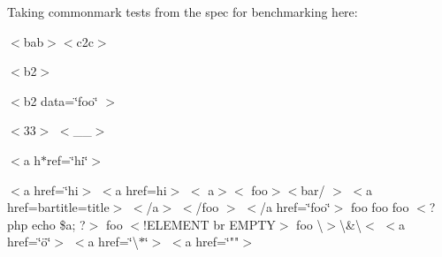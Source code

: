 Taking commonmark tests from the spec for benchmarking here\+:

$<$bab$>$$<$c2c$>$

$<$b2$>$

$<$b2 data=\char`\"{}foo\char`\"{} $>$

\texorpdfstring{$<$}{<}33\texorpdfstring{$>$}{>} $<$\+\_\+\+\_\+$>$

\texorpdfstring{$<$}{<}a h$\ast$ref=\char`\"{}hi\char`\"{}\texorpdfstring{$>$}{>}

\texorpdfstring{$<$}{<}a href=\char`\"{}hi\textquotesingle{}$>$ $<$a href=hi\textquotesingle{}$>$  $<$ a$>$$<$ foo$>$$<$bar/ $>$  $<$a href=\textquotesingle{}bar\textquotesingle{}title=title$>$  $<$/a$>$ $<$/foo $>$  $<$/a href=\char`\"{}foo\char`\"{}$>$  foo    foo   foo $<$?php echo \$a; ?$>$  foo $<$!\+ELEMENT br EMPTY$>$  foo \textbackslash{}$>$\textbackslash{}\&\textbackslash{}$<$  $<$a href=\char`\"{}\"{o}\char`\"{}$>$  $<$a href=\char`\"{}\textbackslash{}$\ast$\char`\"{}$>$  $<$a href=\char`\"{}"{}"{}\texorpdfstring{$>$}{>} 